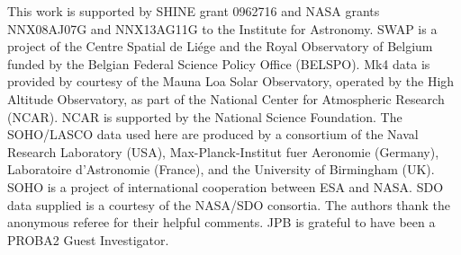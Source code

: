 \documentclass[namedreferences]{solarphysics}
\begin{document}
\begin{article}
%
 \begin{acks}
 
This work is supported by SHINE grant 0962716 and NASA grants NNX08AJ07G and NNX13AG11G to the Institute for Astronomy.
SWAP is a project of the Centre Spatial de Li\'ege and the Royal Observatory of Belgium funded by the Belgian Federal Science Policy Office (BELSPO).
Mk4 data is provided by courtesy of the Mauna Loa Solar Observatory, operated by the High Altitude Observatory, as part of the National Center for Atmospheric Research (NCAR). NCAR is supported by the National Science Foundation.
The SOHO/LASCO data used here are produced by a consortium of the Naval Research Laboratory (USA), Max-Planck-Institut fuer Aeronomie (Germany), Laboratoire d'Astronomie (France), and the University of Birmingham (UK). SOHO is a project of international cooperation between ESA and NASA.
SDO data supplied is a courtesy of the NASA/SDO consortia. The authors thank the anonymous referee for their helpful comments. JPB is grateful to have been a PROBA2 Guest Investigator.

 \end{acks}


%
%
 
   
%
%
%   
%  

\end{article} 
\end{document}
